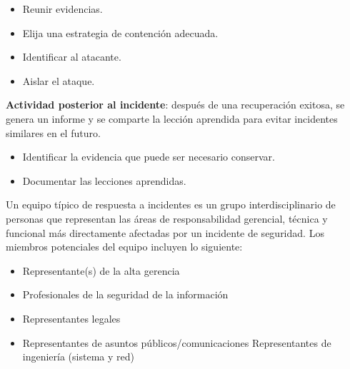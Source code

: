 \begin{itemize}
\begin{itemize}
    \item Reunir evidencias.
    \item Elija una estrategia de contención adecuada.
    \item Identificar al atacante.
    \item Aislar el ataque.
\end{itemize}
\textbf{Actividad posterior al incidente}: después de una recuperación exitosa, se genera un informe y se comparte la lección aprendida para evitar incidentes similares en el futuro.
\begin{itemize}
    \item Identificar la evidencia que puede ser necesario conservar.
\item Documentar las lecciones aprendidas.
\end{itemize}
\end{itemize}

Un equipo típico de respuesta a incidentes es un grupo interdisciplinario de personas que representan las áreas de responsabilidad gerencial, técnica y funcional más directamente afectadas por un incidente de seguridad. Los miembros potenciales del equipo incluyen lo siguiente:

\begin{itemize}
    \item Representante(s) de la alta gerencia
    \item Profesionales de la seguridad de la información
    \item Representantes legales
    \item Representantes de asuntos públicos/comunicaciones
Representantes de ingeniería (sistema y red)

\end{itemize}







